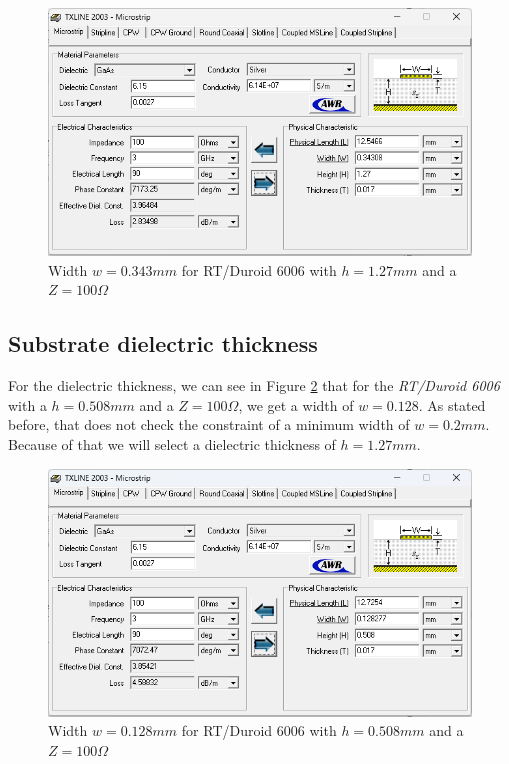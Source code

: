 \documentclass[12pt]{report} %
\begin{document}
\begin{figure}[htbp]
    \centering
    \includegraphics[width=\textwidth]{images/previous_work/txline_tool_duroid_6006_h_1_27_mm_100_ohm.png}
    \caption{Width $w = 0.343 mm$ for RT/Duroid 6006 with $h = 1.27 mm$ and a $Z = 100 \Omega$}
    \label{fig:previous_work:duroid_6006_h_1_27_mm_100_ohm}
\end{figure}

\subsection{Substrate dielectric thickness}

For the dielectric thickness, we can see in Figure \ref{fig:previous_work:duroid_6006_h_0_508_mm_100_ohm} that for the \textit{RT/Duroid 6006} with a $h = 0.508 mm$ and a $Z = 100 \Omega$, we get a width of $w = 0.128$. As stated before, that does not check the constraint of a minimum width of $w = 0.2 mm$. Because of that we will select a dielectric thickness of $h = 1.27 mm$.

\begin{figure}[htbp]
    \centering
    \includegraphics[width=\textwidth]{images/previous_work/txline_tool_duroid_6006_h_0_508_mm_100_ohm.png}
    \caption{Width $w = 0.128 mm$ for RT/Duroid 6006 with $h = 0.508 mm$ and a $Z = 100 \Omega$}
    \label{fig:previous_work:duroid_6006_h_0_508_mm_100_ohm}
\end{figure}
\end{document}

